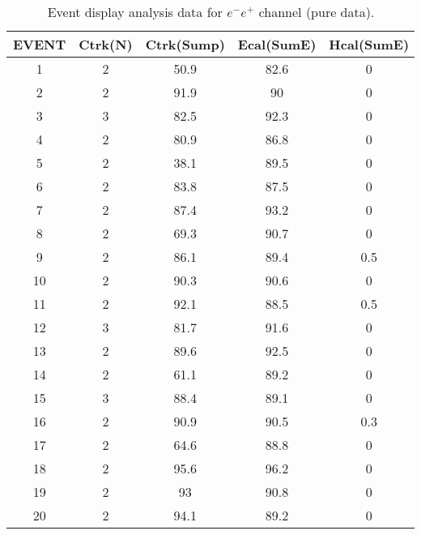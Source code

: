 \begin{table}[h!]
    \centering
    \caption{Event display analysis data for $e^-e^+$ channel (pure data).}
    \begin{tabular}{|ccccc|}
    \hline
    EVENT & Ctrk(N) & Ctrk(Sump) & Ecal(SumE) & Hcal(SumE) \\ \hline
    1     & 2       & 50.9       & 82.6       & 0          \\
    2     & 2       & 91.9       & 90         & 0          \\
    3     & 3       & 82.5       & 92.3       & 0          \\
    4     & 2       & 80.9       & 86.8       & 0          \\
    5     & 2       & 38.1       & 89.5       & 0          \\
    6     & 2       & 83.8       & 87.5       & 0          \\
    7     & 2       & 87.4       & 93.2       & 0          \\
    8     & 2       & 69.3       & 90.7       & 0          \\
    9     & 2       & 86.1       & 89.4       & 0.5        \\
    10    & 2       & 90.3       & 90.6       & 0          \\
    11    & 2       & 92.1       & 88.5       & 0.5        \\
    12    & 3       & 81.7       & 91.6       & 0          \\
    13    & 2       & 89.6       & 92.5       & 0          \\
    14    & 2       & 61.1       & 89.2       & 0          \\
    15    & 3       & 88.4       & 89.1       & 0          \\
    16    & 2       & 90.9       & 90.5       & 0.3        \\
    17    & 2       & 64.6       & 88.8       & 0          \\
    18    & 2       & 95.6       & 96.2       & 0          \\
    19    & 2       & 93         & 90.8       & 0          \\
    20    & 2       & 94.1       & 89.2       & 0         \\ \hline
    \end{tabular}
    \label{table:ed-ee}
\end{table}
    
